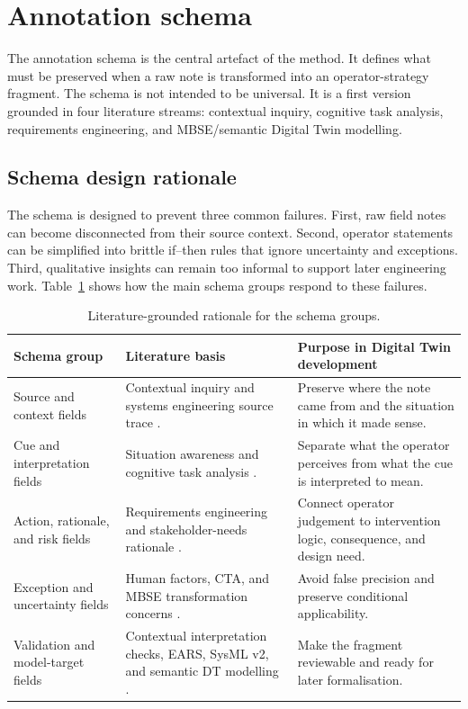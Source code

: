 \section{Annotation schema}
\label{sec:schema}

The annotation schema is the central artefact of the method. It defines what must be preserved when a raw note is transformed into an operator-strategy fragment. The schema is not intended to be universal. It is a first version grounded in four literature streams: contextual inquiry, cognitive task analysis, requirements engineering, and MBSE/semantic Digital Twin modelling.

\subsection{Schema design rationale}

The schema is designed to prevent three common failures. First, raw field notes can become disconnected from their source context. Second, operator statements can be simplified into brittle if--then rules that ignore uncertainty and exceptions. Third, qualitative insights can remain too informal to support later engineering work. Table~\ref{tab:schema-rationale} shows how the main schema groups respond to these failures.

\begin{table}[htbp]
\centering
\caption{Literature-grounded rationale for the schema groups.}
\label{tab:schema-rationale}
\begin{tabularx}{\textwidth}{p{}p{}X}
\toprule
Schema group & Literature basis & Purpose in Digital Twin development \\
\midrule
Source and context fields & Contextual inquiry and systems engineering source trace \cite{beyer1995apprenticing,sebokStakeholder,sebokRequirements}. & Preserve where the note came from and the situation in which it made sense. \\
Cue and interpretation fields & Situation awareness and cognitive task analysis \cite{endsley1995situation,crandall2006workingminds,klein1989critical}. & Separate what the operator perceives from what the cue is interpreted to mean. \\
Action, rationale, and risk fields & Requirements engineering and stakeholder-needs rationale \cite{vanlamsweerde2009requirements,sebokStakeholder,sebokRequirements}. & Connect operator judgement to intervention logic, consequence, and design need. \\
Exception and uncertainty fields & Human factors, CTA, and MBSE transformation concerns \cite{rasmussen1983skills,stanik2021acta,sebokRequirements}. & Avoid false precision and preserve conditional applicability. \\
Validation and model-target fields & Contextual interpretation checks, EARS, SysML v2, and semantic DT modelling \cite{beyer1997contextual,mavin2009ears,omgSysml2024,karabulut2023ontologies}. & Make the fragment reviewable and ready for later formalisation. \\
\bottomrule
\end{tabularx}
\end{table}

